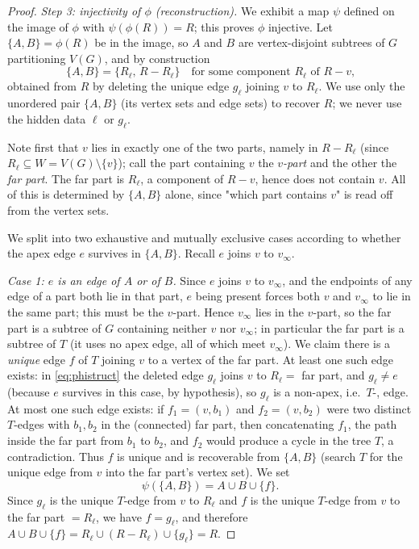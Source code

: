 \begin{proof}
\smallskip\noindent\emph{Step 3: injectivity of $\phi$ (reconstruction).}  We exhibit a map
$\psi$ defined on the image of $\phi$ with $\psi(\phi(R))=R$; this proves $\phi$ injective.
Let $\{A,B\}=\phi(R)$ be in the image, so $A$ and $B$ are vertex-disjoint subtrees of $G$
partitioning $V(G)$, and by construction
\begin{equation}
\label{eq:phistruct}
\{A,B\}=\{R_\ell,\,R-R_\ell\}\quad\text{for some component $R_\ell$ of $R-v$,}
\end{equation}
obtained from $R$ by deleting the unique edge $g_\ell$ joining $v$ to $R_\ell$.  We use only
the unordered pair $\{A,B\}$ (its vertex sets and edge sets) to recover $R$; we never use the
hidden data $\ell$ or $g_\ell$.

Note first that $v$ lies in exactly one of the two parts, namely in $R-R_\ell$ (since
$R_\ell\subseteq W=V(G)\setminus\{v\}$); call the part containing $v$ the \emph{$v$-part} and
the other the \emph{far part}.  The far part is $R_\ell$, a component of $R-v$, hence does not
contain $v$.  All of this is determined by $\{A,B\}$ alone, since "which part contains $v$"
is read off from the vertex sets.

We split into two exhaustive and mutually exclusive cases according to whether the apex edge
$e$ survives in $\{A,B\}$.  Recall $e$ joins $v$ to $v_\infty$.

\emph{Case 1: $e$ is an edge of $A$ or of $B$.}  Since $e$ joins $v$ to $v_\infty$, and the
endpoints of any edge of a part both lie in that part, $e$ being present forces both $v$ and
$v_\infty$ to lie in the same part; this must be the $v$-part.  Hence $v_\infty$ lies in the
$v$-part, so the far part is a subtree of $G$ containing neither $v$ nor $v_\infty$; in
particular the far part is a subtree of $T$ (it uses no apex edge, all of which meet
$v_\infty$).  We claim there is a \emph{unique} edge $f$ of $T$ joining $v$ to a vertex of the
far part.  At least one such edge exists: in \eqref{eq:phistruct} the deleted edge $g_\ell$
joins $v$ to $R_\ell=$ far part, and $g_\ell\ne e$ (because $e$ survives in this case, by
hypothesis), so $g_\ell$ is a non-apex, i.e.\ $T$-, edge.  At most one such edge exists: if
$f_1=(v,b_1)$ and $f_2=(v,b_2)$ were two distinct $T$-edges with $b_1,b_2$ in the (connected)
far part, then concatenating $f_1$, the path inside the far part from $b_1$ to $b_2$, and
$f_2$ would produce a cycle in the tree $T$, a contradiction.  Thus $f$ is unique and is
recoverable from $\{A,B\}$ (search $T$ for the unique edge from $v$ into the far part's vertex
set).  We set
\[
\psi(\{A,B\})=A\cup B\cup\{f\}.
\]
Since $g_\ell$ is the unique $T$-edge from $v$ to $R_\ell$ and $f$ is the unique $T$-edge from
$v$ to the far part $=R_\ell$, we have $f=g_\ell$, and therefore
$A\cup B\cup\{f\}=R_\ell\cup(R-R_\ell)\cup\{g_\ell\}=R$.


\end{proof}
